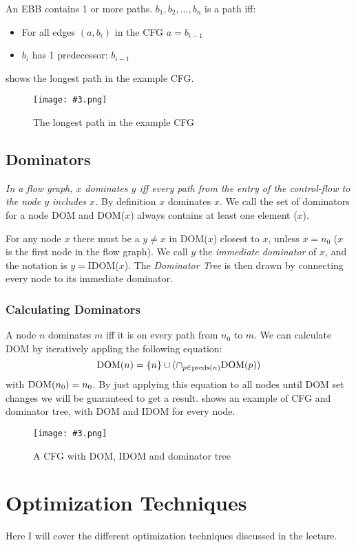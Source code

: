 \documentclass{article}
\newcommand{\fig}[4]{
	\begin{figure}[#1]
		\center
		\texttt{[image: \#3.png]}
		\caption{#4}
		\label{fig:#3}
	\end{figure}
	}
\begin{document}
An EBB contains 1 or more paths.
$b_1,b_2,\dots,b_n$ is a path iff:
\begin{itemize}
	\item For all edges $(a, b_i)$ in the CFG $a=b_{i-1}$
	\item $b_i$ has 1 predecessor: $b_{i-1}$
\end{itemize}
 shows the longest path in the example CFG.

\fig{h}{0.7}{path}{The longest path in the example CFG}

\subsection{Dominators}
\emph{In a flow graph, $x$ dominates $y$ iff every path from the entry of the control-flow to the node $y$ includes $x$.}
By definition $x$ dominates $x$.
We call the set of dominators for a node DOM and DOM($x$) always contains at least one element ($x$).

For any node $x$ there must be a $y \neq x$ in DOM($x$) closest to $x$, unless $x=n_0$ ($x$ is the first node in the flow graph).
We call $y$ the \emph{immediate dominator} of $x$, and the notation is $y=$IDOM($x$).
The \emph{Dominator Tree} is then drawn by connecting every node to its immediate dominator.

\subsubsection{Calculating Dominators}
A node $n$ dominates $m$ iff it is on every path from $n_0$ to $m$.
We can calculate DOM by iteratively appling the following equation:
\begin{equation}
	\textup{DOM}(n) = \{n\} \cup (\cap_{p \in \textup{preds}(n)} \textup{DOM}(p))
\end{equation}
with $\textup{DOM}(n_0) = {n_0}$.
By just applying this equation to all nodes until DOM set changes we will be guaranteed to get a result.
 shows an example of CFG and dominator tree, with DOM and IDOM for every node.

\fig{h}{0.8}{domtree}{A CFG with DOM, IDOM and dominator tree}

\section{Optimization Techniques}
Here I will cover the different optimization techniques discussed in the lecture.
\end{document}
